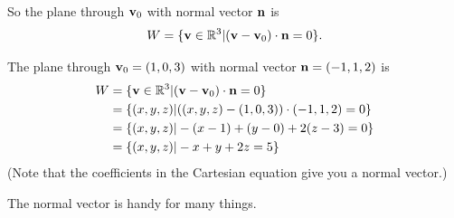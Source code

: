 So the plane through $\mathbf{v}_0$ with normal vector $\mathbf{n}$ is
$$
W = \{ \mathbf{v} \in \mathbb{R}^3 | (\mathbf{v} - \mathbf{v}_0) \cdot \mathbf{n} = 0 \}.
$$

\begin{myexample}
The plane through $\mathbf{v}_0 = (1,0,3)$ with normal vector $\mathbf{n} = (-1,1,2)$
is
\begin{align*}
W &= \{ \mathbf{v} \in \mathbb{R}^3 | (\mathbf{v}-\mathbf{v}_0)\cdot \mathbf{n}=0\}\\
&= \{ (x,y,z) | ((x,y,z)-(1,0,3))\cdot (-1,1,2)=0\}\\
&= \{ (x,y,z) | -(x-1)+(y-0) + 2(z-3) = 0\}\\
&= \{ (x,y,z) | -x+y+2z = 5\}
\end{align*}
(Note that the coefficients in the Cartesian equation give you a normal vector.)
\end{myexample}

The normal vector is handy for many things.

